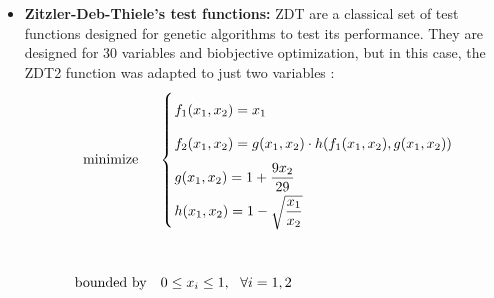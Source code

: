 \begin{itemize}
\item \textbf{Zitzler-Deb-Thiele's test functions:} ZDT are a classical set of test functions designed for genetic algorithms to test its performance. They are designed for 30 variables and biobjective optimization, but in this case, the ZDT2 function was adapted to just two variables \cite{zitzler2000comparison}:
    \begin{equation}
\begin{array}{cl}
            \textrm{minimize} & 
            \left\{
             \arraycolsep=1.0pt\def\arraystretch{2.0} \begin{array}{l}
            f_1(x_1,x_2) = x_1\\
            f_2(x_1,x_2) = g(x_1,x_2) \cdot h(f_1(x_1,x_2),g(x_1,x_2))\\
            g(x_1,x_2) = 1+\dfrac{9x_2}{29} \\
            h(x_1,x_2) = 1 - \sqrt{\dfrac{x_1}{x_2}}
            \end{array} \right. \\
            & \\
           \textrm{bounded by} & 0 \leq x_i \leq 1, \ \ \forall i = 1,2
        \end{array}
        \label{eq:ZDT2}
    \end{equation}
\end{itemize}

\newpage

